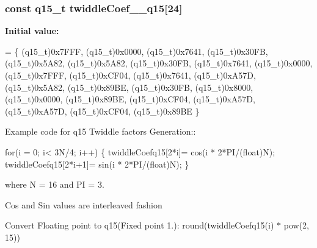 \subsubsection[{\texorpdfstring{twiddle\+Coef\+\_\+16\+\_\+q15}{twiddleCoef_16_q15}}]{\setlength{\rightskip}{0pt plus 5cm}const q15\+\_\+t twiddle\+Coef\+\_\+\_\+q15\mbox{[}24\mbox{]}}\hypertarget{group__CFFT__CIFFT_ga8e4e2e05f4a3112184c96cb3308d6c39}{}\label{group__CFFT__CIFFT_ga8e4e2e05f4a3112184c96cb3308d6c39}
{\bfseries Initial value\+:}
\begin{DoxyCode}
= \{
    (q15\_t)0x7FFF, (q15\_t)0x0000,
    (q15\_t)0x7641, (q15\_t)0x30FB,
    (q15\_t)0x5A82, (q15\_t)0x5A82,
    (q15\_t)0x30FB, (q15\_t)0x7641,
    (q15\_t)0x0000, (q15\_t)0x7FFF,
    (q15\_t)0xCF04, (q15\_t)0x7641,
    (q15\_t)0xA57D, (q15\_t)0x5A82,
    (q15\_t)0x89BE, (q15\_t)0x30FB,
    (q15\_t)0x8000, (q15\_t)0x0000,
    (q15\_t)0x89BE, (q15\_t)0xCF04,
    (q15\_t)0xA57D, (q15\_t)0xA57D,
    (q15\_t)0xCF04, (q15\_t)0x89BE
\}
\end{DoxyCode}
\begin{DoxyParagraph}{}
Example code for q15 Twiddle factors Generation\+:\+: 
\end{DoxyParagraph}
\begin{DoxyParagraph}{}

\begin{DoxyPre}for(i = 0; i< 3N/4; i++)
\{
   twiddleCoefq15[2*i]= cos(i * 2*PI/(float)N);
   twiddleCoefq15[2*i+1]= sin(i * 2*PI/(float)N);
\} \end{DoxyPre}
 
\end{DoxyParagraph}
\begin{DoxyParagraph}{}
where N = 16 and PI = 3. 
\end{DoxyParagraph}
\begin{DoxyParagraph}{}
Cos and Sin values are interleaved fashion 
\end{DoxyParagraph}
\begin{DoxyParagraph}{}
Convert Floating point to q15(Fixed point 1.)\+: round(twiddle\+Coefq15(i) $\ast$ pow(2, 15)) 
\end{DoxyParagraph}
